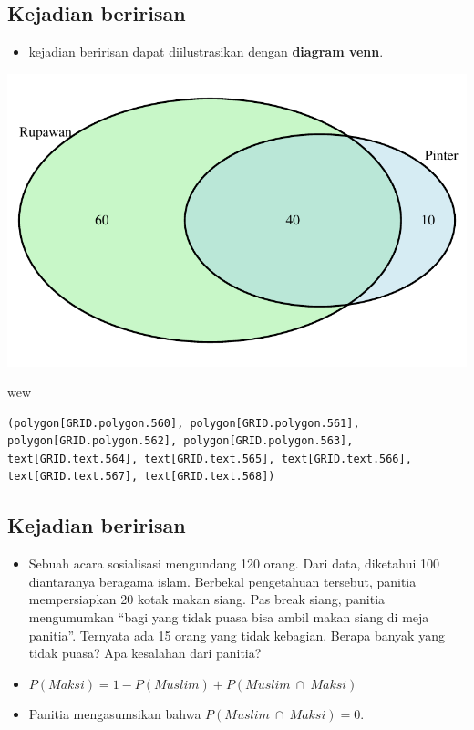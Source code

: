 \documentclass[
  letterpaper,
  DIV=11,
  numbers=noendperiod]{scrartcl}
\newenvironment{Shaded}{\begin{snugshade}}{\end{snugshade}}
\newcommand{\NormalTok}[1]{\textcolor[rgb]{0.00,0.23,0.31}{#1}}
\providecommand{\tightlist}{%
  \setlength{\itemsep}{0pt}\setlength{\parskip}{0pt}}\usepackage{longtable,booktabs,array}
\begin{document}
\subsection{Kejadian beririsan}\label{kejadian-beririsan-2}

\begin{itemize}
\tightlist
\item
  kejadian beririsan dapat diilustrasikan dengan \textbf{diagram venn}.
\end{itemize}

\includegraphics{index_files/figure-pdf/unnamed-chunk-11-1.pdf}

\begin{Shaded}
\begin{Highlighting}[]
\NormalTok{wew}
\end{Highlighting}
\end{Shaded}

\begin{verbatim}
(polygon[GRID.polygon.560], polygon[GRID.polygon.561], polygon[GRID.polygon.562], polygon[GRID.polygon.563], text[GRID.text.564], text[GRID.text.565], text[GRID.text.566], text[GRID.text.567], text[GRID.text.568]) 
\end{verbatim}

\subsection{Kejadian beririsan}\label{kejadian-beririsan-3}

\begin{itemize}
\item
  Sebuah acara sosialisasi mengundang 120 orang. Dari data, diketahui
  100 diantaranya beragama islam. Berbekal pengetahuan tersebut, panitia
  mempersiapkan 20 kotak makan siang. Pas break siang, panitia
  mengumumkan ``bagi yang tidak puasa bisa ambil makan siang di meja
  panitia''. Ternyata ada 15 orang yang tidak kebagian. Berapa banyak
  yang tidak puasa? Apa kesalahan dari panitia?
\item
  \(P(Maksi)=1-P(Muslim)+P(Muslim \ \cap \ Maksi)\)
\item
  Panitia mengasumsikan bahwa \(P(Muslim \ \cap \ Maksi) = 0\).
\end{itemize}
\end{document}
